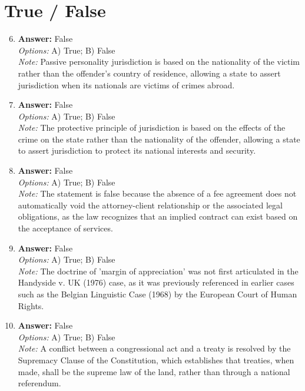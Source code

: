 \documentclass[12pt]{article}
\begin{document}
\section*{True / False}
\begin{enumerate}[label=\arabic*.]
\setcounter{enumi}{5}
\item \textbf{Answer:} False
\\ \textit{Options:} A) True; B) False
\\ \textit{Note:} Passive personality jurisdiction is based on the nationality of the victim rather than the offender's country of residence, allowing a state to assert jurisdiction when its nationals are victims of crimes abroad.
\item \textbf{Answer:} False
\\ \textit{Options:} A) True; B) False
\\ \textit{Note:} The protective principle of jurisdiction is based on the effects of the crime on the state rather than the nationality of the offender, allowing a state to assert jurisdiction to protect its national interests and security.
\item \textbf{Answer:} False
\\ \textit{Options:} A) True; B) False
\\ \textit{Note:} The statement is false because the absence of a fee agreement does not automatically void the attorney-client relationship or the associated legal obligations, as the law recognizes that an implied contract can exist based on the acceptance of services.
\item \textbf{Answer:} False
\\ \textit{Options:} A) True; B) False
\\ \textit{Note:} The doctrine of 'margin of appreciation' was not first articulated in the Handyside v. UK (1976) case, as it was previously referenced in earlier cases such as the Belgian Linguistic Case (1968) by the European Court of Human Rights.
\item \textbf{Answer:} False
\\ \textit{Options:} A) True; B) False
\\ \textit{Note:} A conflict between a congressional act and a treaty is resolved by the Supremacy Clause of the Constitution, which establishes that treaties, when made, shall be the supreme law of the land, rather than through a national referendum.
\end{enumerate}
\end{document}
